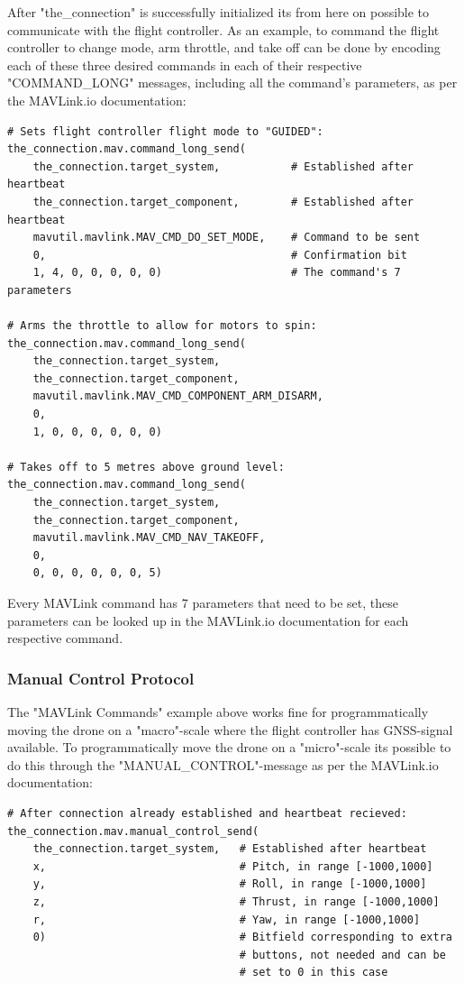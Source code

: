 After "the\_connection" is successfully initialized its from here on possible to communicate with the flight controller.
\newpage
As an example, to command the flight controller to change mode, arm throttle, and take off can be done by encoding each of these three desired commands in each of their respective "COMMAND\_LONG" messages, including all the command's parameters, as per the MAVLink.io\cite{documentation-MAVLink} documentation:
\begin{lstlisting}[language=PythonPlus]
# Sets flight controller flight mode to "GUIDED":
the_connection.mav.command_long_send(
    the_connection.target_system,           # Established after heartbeat
    the_connection.target_component,        # Established after heartbeat
    mavutil.mavlink.MAV_CMD_DO_SET_MODE,    # Command to be sent
    0,                                      # Confirmation bit
    1, 4, 0, 0, 0, 0, 0)                    # The command's 7 parameters

# Arms the throttle to allow for motors to spin:
the_connection.mav.command_long_send(
    the_connection.target_system,
    the_connection.target_component,
    mavutil.mavlink.MAV_CMD_COMPONENT_ARM_DISARM,
    0,
    1, 0, 0, 0, 0, 0, 0)

# Takes off to 5 metres above ground level:
the_connection.mav.command_long_send(
    the_connection.target_system,
    the_connection.target_component,
    mavutil.mavlink.MAV_CMD_NAV_TAKEOFF,
    0,
    0, 0, 0, 0, 0, 0, 5)
\end{lstlisting}

Every MAVLink command has 7 parameters that need to be set, these parameters can be looked up in the MAVLink.io\cite{documentation-MAVLink} documentation for each respective command.

\subsubsection{Manual Control Protocol}
The "MAVLink Commands" example above works fine for programmatically moving the drone on a "macro"-scale where the flight controller has GNSS-signal available. To programmatically move the drone on a "micro"-scale its possible to do this through the "MANUAL\_CONTROL"-message as per the MAVLink.io\cite{documentation-MAVLink} documentation:

\begin{lstlisting}[language=PythonPlus]
# After connection already established and heartbeat recieved:
the_connection.mav.manual_control_send(
    the_connection.target_system,   # Established after heartbeat
    x,                              # Pitch, in range [-1000,1000]
    y,                              # Roll, in range [-1000,1000]
    z,                              # Thrust, in range [-1000,1000]
    r,                              # Yaw, in range [-1000,1000]
    0)                              # Bitfield corresponding to extra
                                    # buttons, not needed and can be
                                    # set to 0 in this case
\end{lstlisting}


